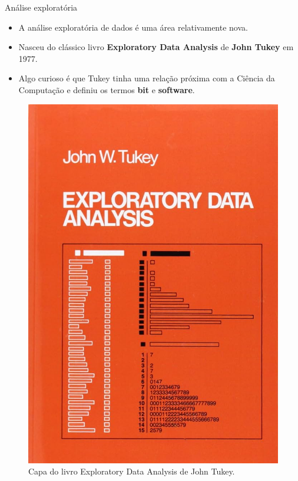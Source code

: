 \documentclass[
  ignorenonframetext,
  serif,
  professionalfont,
  usenames,
  dvipsnames,
  aspectratio = 169]{beamer}
\providecommand{\tightlist}{%
  \setlength{\itemsep}{0pt}\setlength{\parskip}{0pt}}
\renewcommand{\tightlist}{%
  \setlength{\itemsep}{0\baselineskip}
  \setlength{\parskip}{0.25\baselineskip}
}
\def\beginAHalfColumn{\begin{minipage}{0.49\textwidth}}%
\def\endColumns{\end{minipage}}%
\begin{document}
\begin{frame}{Análise exploratória}
\label{anuxe1lise-exploratuxf3ria-1}
\beginAHalfColumn

\begin{itemize}
\tightlist
\item
  A análise exploratória de dados é uma área relativamente nova.
\end{itemize}

\vspace{0.3cm}

\begin{itemize}
\tightlist
\item
  Nasceu do clássico livro \textbf{Exploratory Data Analysis} de
  \textbf{John Tukey} em 1977.
\end{itemize}

\vspace{0.3cm}

\begin{itemize}
\tightlist
\item
  Algo curioso é que Tukey tinha uma relação próxima com a Ciência da
  Computação e definiu os termos \textbf{bit} e \textbf{software}.
\end{itemize}

\endColumns
\beginAHalfColumn

\begin{figure}

{\centering \includegraphics[width=0.62\linewidth]{./img/eda-tukey} 

}

\caption{Capa do livro Exploratory Data Analysis de John Tukey.}\label{fig:unnamed-chunk-2}
\end{figure}

\endColumns
\end{frame}
\end{document}
